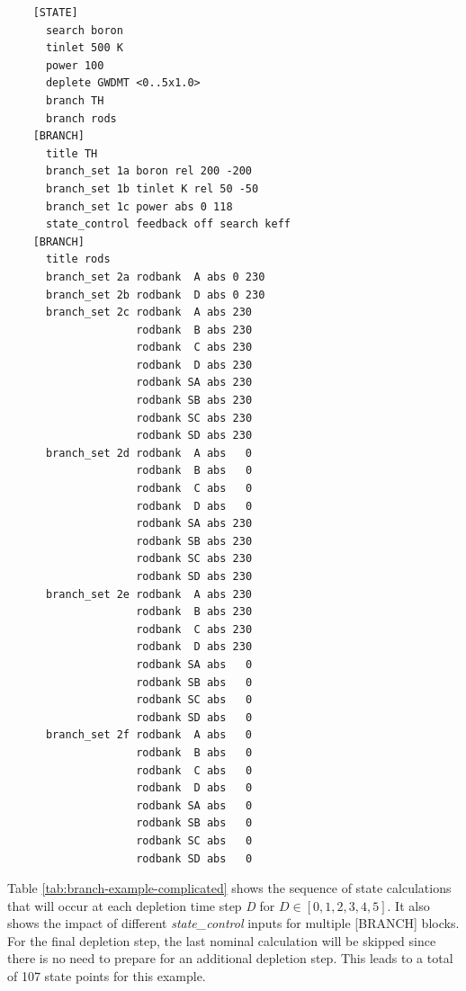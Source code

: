 \begin{verbatim}
    [STATE]
      search boron
      tinlet 500 K
      power 100
      deplete GWDMT <0..5x1.0>
      branch TH
      branch rods
    [BRANCH]
      title TH
      branch_set 1a boron rel 200 -200
      branch_set 1b tinlet K rel 50 -50
      branch_set 1c power abs 0 118
      state_control feedback off search keff
    [BRANCH]
      title rods
      branch_set 2a rodbank  A abs 0 230
      branch_set 2b rodbank  D abs 0 230
      branch_set 2c rodbank  A abs 230
                    rodbank  B abs 230
                    rodbank  C abs 230
                    rodbank  D abs 230
                    rodbank SA abs 230
                    rodbank SB abs 230
                    rodbank SC abs 230
                    rodbank SD abs 230
      branch_set 2d rodbank  A abs   0
                    rodbank  B abs   0
                    rodbank  C abs   0
                    rodbank  D abs   0
                    rodbank SA abs 230
                    rodbank SB abs 230
                    rodbank SC abs 230
                    rodbank SD abs 230
      branch_set 2e rodbank  A abs 230
                    rodbank  B abs 230
                    rodbank  C abs 230
                    rodbank  D abs 230
                    rodbank SA abs   0
                    rodbank SB abs   0
                    rodbank SC abs   0
                    rodbank SD abs   0
      branch_set 2f rodbank  A abs   0
                    rodbank  B abs   0
                    rodbank  C abs   0
                    rodbank  D abs   0
                    rodbank SA abs   0
                    rodbank SB abs   0
                    rodbank SC abs   0
                    rodbank SD abs   0
\end{verbatim}

Table \ref{tab:branch-example-complicated} shows the sequence of state calculations that will occur at each depletion time step \emph{D} for $D \in [0, 1, 2, 3, 4, 5]$. It also shows the impact of different \emph{state\_control} inputs for multiple [BRANCH] blocks.  For the final depletion step, the last nominal calculation will be skipped since there is no need to prepare for an additional depletion step.  This leads to a total of 107 state points for this example.

